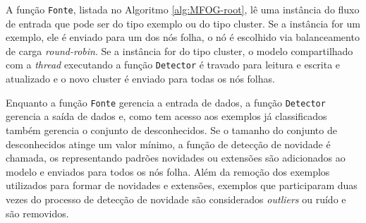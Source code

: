 A função \texttt{Fonte}, listada no Algoritmo \ref{alg:MFOG-root}, lê uma
instância do fluxo de entrada que pode ser do tipo exemplo ou do tipo cluster.
Se a instância for um exemplo, ele é enviado para um dos nós folha, o nó é
escolhido via balanceamento de carga \emph{round-robin}.
Se a instância for do tipo cluster, o modelo compartilhado com a \emph{thread}
executando a função \texttt{Detector} é travado para leitura e escrita e
atualizado e o novo cluster é enviado para todas os nós folhas.

Enquanto a função \texttt{Fonte} gerencia a entrada de dados, a função
\texttt{Detector} gerencia a saída de dados e, como tem acesso aos exemplos já
classificados também gerencia o conjunto de desconhecidos.
Se o tamanho do conjunto de desconhecidos atinge um valor mínimo, a função de
detecção de novidade é chamada, os \mclusters representando padrões novidades ou
extensões são adicionados ao modelo e enviados para todos os nós folha.
Além da remoção dos exemplos utilizados para formar \mclusters de novidades e
extensões, exemplos que participaram duas vezes do processo de detecção de
novidade são considerados \emph{outliers} ou ruído e são removidos.


